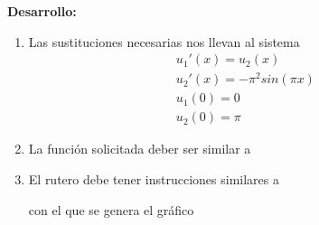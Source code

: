 \documentclass[letter,11pt]{article}
\begin{document}
\begin{enumerate}
\textbf{Desarrollo:}
\begin{enumerate}
    \item Las sustituciones necesarias nos llevan al sistema
    $$
    \begin{array}{l}
    u_1'(x)=u_2(x)\\
    u_2'(x)=-\pi^2 sin(\pi x) \\
    u_1(0)=0\\
    u_2(0)=\pi
    \end{array}
    $$
    \hfill{}

    \item La funci\'on solicitada deber ser similar a
    
    \hfill{}

    \item El rutero debe tener instrucciones similares a
    
    \hfill{}
    con el que se genera el gr\'afico
    
\end{enumerate}

\end{enumerate}
\end{document}
